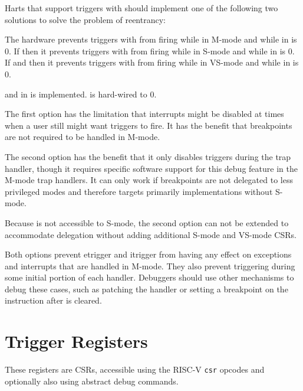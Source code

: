 \begin{steps}{Harts that support triggers with 
should implement one of the following two solutions to solve the problem of
reentrancy:}
\item The hardware prevents triggers with  from
firing while in M-mode and while \FcsrMstatusMie in \Rmstatus is 0.  If
 then it prevents triggers with 
from firing while in S-mode and while \FcsrSstatusSie in \Rsstatus is 0.
If  and  then it prevents triggers with
 from firing while in VS-mode and while
\FcsrSstatusSie in \Rvsstatus is 0.
\item \FcsrTcontrolMte and \FcsrTcontrolMpte in \RcsrTcontrol is
implemented.  \Rmedeleg[3] is hard-wired to 0.
\end{steps}

\begin{commentary}
The first option has the limitation that interrupts might be disabled at
times when a user still might want triggers to fire.  It has the benefit
that breakpoints are not required to be handled in M-mode.

The second option has the benefit that it only disables triggers during
the trap handler, though it requires specific software support for this debug
feature in the M-mode trap handlers.  It can only work if breakpoints are not
delegated to less privileged modes and therefore targets primarily
implementations without S-mode.

Because \RcsrTcontrol is not accessible to S-mode, the second option can
not be extended to accommodate delegation without adding additional S-mode
and VS-mode CSRs.

Both options prevent etrigger and itrigger from having any effect on
exceptions and interrupts that are handled in M-mode.  They also prevent
triggering during some initial portion of each handler.  Debuggers should
use other mechanisms to debug these cases, such as patching the handler
or setting a breakpoint on the instruction after \FcsrMstatusMie is cleared.
\end{commentary}

\section{Trigger Registers}

These registers are CSRs, accessible using the RISC-V {\tt csr} opcodes and
optionally also using abstract debug commands.

